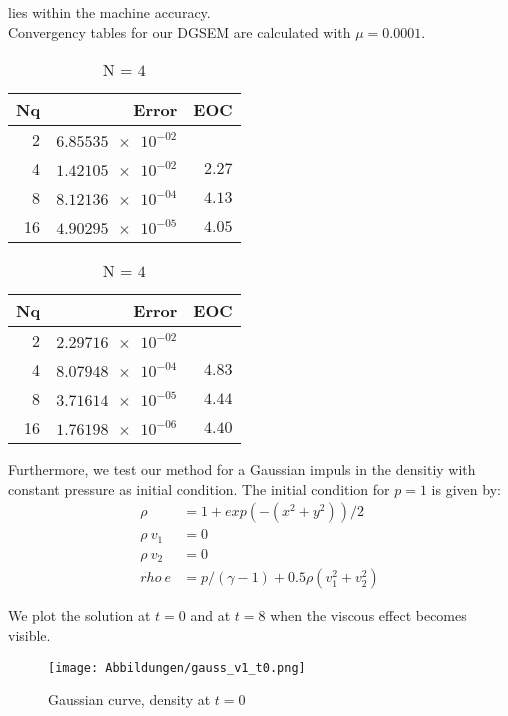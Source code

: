 \documentclass[11pt]{scrartcl}
\begin{document}
lies within the machine accuracy.\\

Convergency tables for our DGSEM are calculated with $\mu=0.0001$.

\begin{table}[H]
\parbox{.45\linewidth}{
\centering
    \begin{tabular}{|r|r|r|}
    \hline\hline
    \textbf{Nq} & \textbf{Error} & \textbf{EOC} \\\hline
    2 & $\num{6.85535e-02}$ &  \\
    4 & $\num{1.42105e-02}$ & $\num{2.27}$ \\
    8 & $\num{8.12136e-04}$ & $\num{4.13}$ \\
    16 & $\num{4.90295e-05}$ & $\num{4.05}$ \\\hline\hline
  \end{tabular} 
  \caption{N = $3$}
  }
  \hspace{0.5cm}
  \parbox{.45\linewidth}{
	\centering
    \begin{tabular}{|r|r|r|}
    \hline\hline
    \textbf{Nq} & \textbf{Error} & \textbf{EOC} \\\hline
    2 & $\num{2.29716e-02}$ &  \\
    4 & $\num{8.07948e-04}$ & $\num{4.83}$ \\
    8 & $\num{3.71614e-05}$ & $\num{4.44}$ \\
    16 & $\num{1.76198e-06}$ & $\num{4.40}$ \\\hline\hline
  \end{tabular}
   \caption{N = $4$}
  }
\end{table}

Furthermore, we test our method for a Gaussian impuls in the densitiy with constant pressure as initial condition.
The initial condition for $p=1$ is given by:
\begin{align*}
	\rho &= 1 + exp(-(x^2 + y^2)) / 2 \\
	\rho \ v_1 &= 0 \\
	\rho \ v_2 &= 0 \\
	rho \ e &= p / (\gamma - 1) + 0.5 \rho (v_1^2 + v_2^2)
\end{align*}

We plot the solution at $t=0$ and at $t=8$ when the viscous effect becomes visible. 
\begin{figure}[H]
	\centering
	\texttt{[image: Abbildungen/gauss\_v1\_t0.png]}
	\caption{Gaussian curve, density at $t=0$}
	\label{gaust0}
\end{figure}
 
\end{document}
